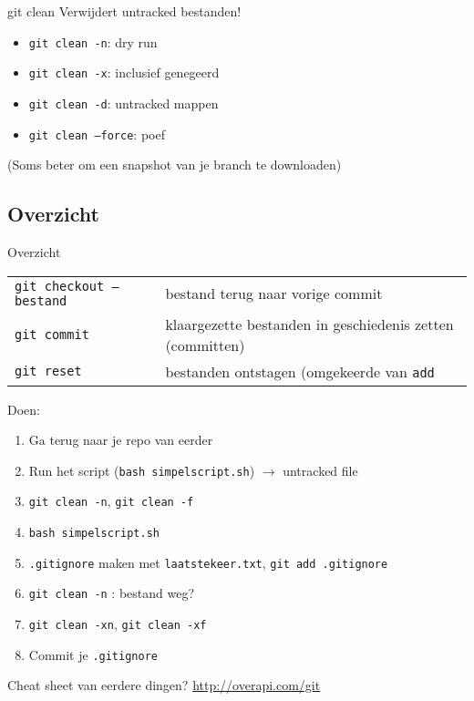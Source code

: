 \begin{frame}{git clean}
	\alert{Verwijdert untracked bestanden!}
	\begin{itemize}
		\item \texttt{git clean -n}: dry run
		\item \texttt{git clean -x}: inclusief genegeerd
		\item \texttt{git clean -d}: untracked mappen
		\item \texttt{git clean --force}: \alert{poef}
	\end{itemize}
	(Soms beter om een snapshot van je branch te downloaden)
\end{frame}

\subsection{Overzicht}
\begin{frame}{Overzicht}
	{ \footnotesize
	\begin{tabular}{ll}
		\texttt{git checkout -- bestand}		& bestand terug naar vorige commit	\\
		\texttt{git commit} & klaargezette bestanden in geschiedenis zetten (committen)\\
		\texttt{git reset}	& bestanden ontstagen (omgekeerde van \texttt{add}
	\end{tabular}
	}
	Doen:
	\begin{enumerate}
		\item Ga terug naar je repo van eerder
		\item Run het script (\texttt{bash simpelscript.sh}) $\rightarrow$ untracked file
		\item \texttt{git clean -n}, \texttt{git clean -f}
		\item \texttt{bash simpelscript.sh}
		\item \texttt{.gitignore} maken met \texttt{laatstekeer.txt}, \texttt{git add .gitignore}
		\item \texttt{git clean -n} : bestand weg?
		\item \texttt{git clean -xn}, \texttt{git clean -xf}
		\item Commit je \texttt{.gitignore}
	\end{enumerate}
	Cheat sheet van eerdere dingen? \url{http://overapi.com/git}
\end{frame}
